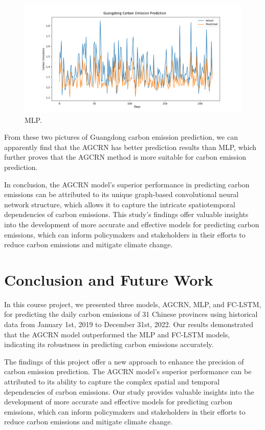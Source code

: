 \documentclass[sigconf, authordraft]{acmart}
\begin{document}
	\begin{figure}[h]
		\centering
		\includegraphics[width=\columnwidth]{figures/MLP.png}
		\caption{MLP.}
		\label{fig:MLP}
	\end{figure}

	From these two pictures of Guangdong carbon emission prediction, we can apparently
	find that the AGCRN has better prediction results than MLP, which further
	proves that the AGCRN method is more suitable for carbon emission prediction.

	In conclusion, the AGCRN model's superior performance in predicting carbon emissions
	can be attributed to its unique graph-based convolutional neural network structure,
	which allows it to capture the intricate spatiotemporal dependencies of carbon
	emissions. This study's findings offer valuable insights into the development of
	more accurate and effective models for predicting carbon emissions, which can
	inform policymakers and stakeholders in their efforts to reduce carbon
	emissions and mitigate climate change.

	\section{Conclusion and Future Work}


	In this course project, we presented three models, AGCRN, MLP, and FC-LSTM, for
	predicting the daily carbon emissions of 31 Chinese provinces using historical
	data from January 1st, 2019 to December 31st, 2022. Our results demonstrated that
	the AGCRN model outperformed the MLP and FC-LSTM models, indicating its
	robustness in predicting carbon emissions accurately.

	The findings of this project offer a new approach to enhance the precision of
	carbon emission prediction. The AGCRN model's superior performance can be attributed
	to its ability to capture the complex spatial and temporal dependencies of carbon
	emissions. Our study provides valuable insights into the development of more
	accurate and effective models for predicting carbon emissions, which can inform
	policymakers and stakeholders in their efforts to reduce carbon emissions and mitigate
	climate change.
\end{document}
